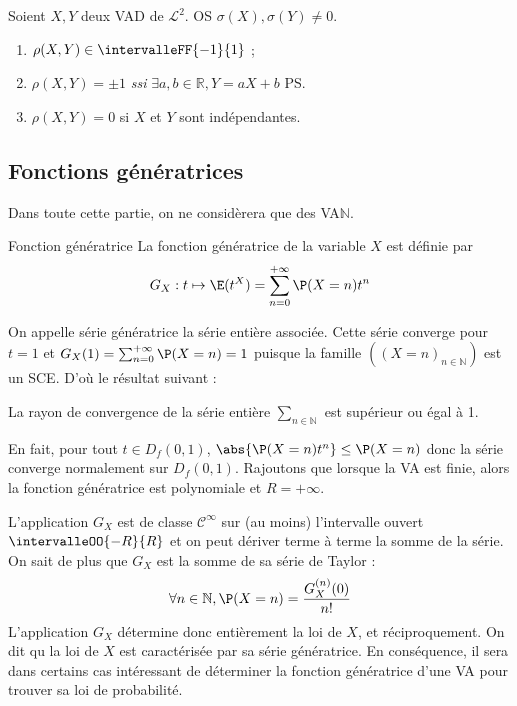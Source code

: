     \begin{prop}{}{}
        Soient $X,Y$ deux VAD de $\mathcal{L}^2$. OS $\sigma(X), \sigma(Y) \neq 0$.
        \begin{enumerate}
            \item $\rho(X,Y) \in \intervalleFF{-1}{1}$ ;
            \item $\rho(X,Y) = \pm 1$ \textit{ssi} $\exists a,b \in \mathbb{R}, Y = a X + b$ PS.
            \item $\rho(X,Y) = 0$ si $X$ et $Y$ sont indépendantes.
        \end{enumerate}
    \end{prop}

\subsection{Fonctions génératrices}

    Dans toute cette partie, on ne considèrera que des VA$\mathbb{N}$. 

    \begin{defi}{Fonction génératrice}{}
        La fonction génératrice de la variable $X$ est définie par 
        \[ G_X : t \mapsto \E(t^X) = \sum_{n=0}^{+\infty} \P(X = n) t^n \]   
    \end{defi}

    On appelle série génératrice la série entière associée. Cette série converge pour $t = 1$ et $G_X(1) = \sum_{n=0}^{+\infty} \P(X = n) = 1$ puisque la famille $((X = n)_{n \in \mathbb{N}})$ est un SCE. D’où le résultat suivant :

    \begin{prop}{}{}
        La rayon de convergence de la série entière $\sum_{n \in \mathbb{N}}$ est supérieur ou égal à 1.
    \end{prop}

    En fait, pour tout $t \in D_f(0,1)$, $\abs{\P(X = n) t^n} \leq \P(X = n)$ donc la série converge normalement sur $D_f(0,1)$. Rajoutons que lorsque la VA est finie, alors la fonction génératrice est polynomiale et $R = +\infty$.

    L’application $G_X$ est de classe $\mathcal{C}^{\infty}$ sur (au moins) l’intervalle ouvert $\intervalleOO{-R}{R}$ et on peut dériver terme à terme la somme de la série. On sait de plus que $G_X$ est la somme de sa série de Taylor : 
    \[ \forall n \in \mathbb{N}, \P(X = n) = \frac{G_X^{(n)}(0)}{n!} \]    
    L’application $G_X$ détermine donc entièrement la loi de $X$, et réciproquement. On dit qu la loi de $X$ est caractérisée par sa série génératrice. En conséquence, il sera dans certains cas intéressant de déterminer la fonction génératrice d’une VA pour trouver sa loi de probabilité. 

